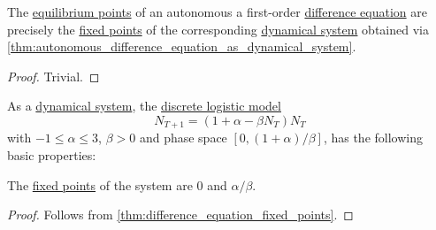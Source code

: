 \begin{proposition}\label{thm:difference_equation_fixed_points}
  The \hyperref[def:difference_equation_equilibrium_point]{equilibrium points} of an autonomous a first-order \hyperref[def:difference_equation]{difference equation} are precisely the \hyperref[def:dynamical_system_fixed_point]{fixed points} of the corresponding \hyperref[def:dynamical_system]{dynamical system} obtained via \cref{thm:autonomous_difference_equation_as_dynamical_system}.
\end{proposition}
\begin{proof}
  Trivial.
\end{proof}

\begin{proposition}\label{thm:discrete_logistic_model_dynamics}
  As a \hyperref[def:dynamical_system]{dynamical system}, the \hyperref[def:discrete_logistic_model]{discrete logistic model}
  \begin{equation*}
    N_{T+1} = (1 + \alpha - \beta N_T) N_T
  \end{equation*}
  with \( -1 \leq \alpha \leq 3 \), \( \beta > 0 \) and phase space \( [0, (1 + \alpha) / \beta] \), has the following basic properties:
  \begin{thmenum}
     The \hyperref[def:dynamical_system_fixed_point]{fixed points} of the system are \( 0 \) and \( \alpha / \beta \).
  \end{thmenum}
\end{proposition}
\begin{proof}
   Follows from \cref{thm:difference_equation_fixed_points}.
\end{proof}
